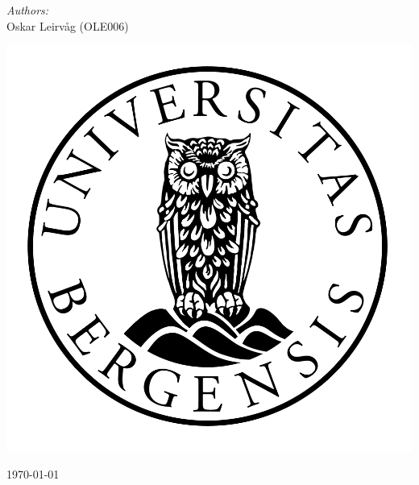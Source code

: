 \begin{titlepage}
    \Large \emph{Authors:}\\
    Oskar Leirvåg (OLE006)
    \\[2cm] %
    \centerline{\includegraphics[scale=0.15]{figures/canvas}} %

    {\large \today}\\[3cm] %


    \vfill

\end{titlepage}